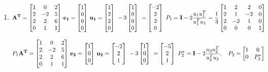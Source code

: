 \documentclass[english,onecolumn]{IEEEtran}
\begin{document}
\begin{enumerate}
	\item  \[
	{\bf A^T}=
	\begin{bmatrix}
		1&0&2\\
		2&-2&5\\
		2&2&6\\
		0&1&1
	\end{bmatrix}\,
	{\bf e_1}=
	\begin{bmatrix}
		1\\
		0\\
		0\\
		0
	\end{bmatrix}\,
	{\bf u_1}=
	\begin{bmatrix}
		1\\
		2\\
		2\\
		0
	\end{bmatrix}\
	-3
	\begin{bmatrix}
		1\\
		0\\
		0\\
		0
	\end{bmatrix}\
	=
	\begin{bmatrix}
		-2\\
		2\\
		2\\
		0
	\end{bmatrix}\
	P_1 = \textbf{I} - 2 \frac{u_1 u_1^T}{u_1^T u_1}
	=\frac{1}{3}
	\begin{bmatrix}
		1&2&2&0\\
		2&1&-2&0\\
		2&-2&1&0\\
		0&0&0&1
	\end{bmatrix}\,
	\]
	
	 \[
	{P_1\bf A^T}=
	\begin{bmatrix}
		1&0&2\\
		2&-2&5\\
		2&2&6\\
		0&1&1
	\end{bmatrix}\,
	{\bf e_2}=
	\begin{bmatrix}
		1\\
		0\\
		0
	\end{bmatrix}\,
	{\bf u_2}=
	\begin{bmatrix}
		-2\\
		2\\
		1
	\end{bmatrix}\
	-3
	\begin{bmatrix}
		1\\
		0\\
		0
	\end{bmatrix}\
	=
	\begin{bmatrix}
		-5\\
		2\\
		1
	\end{bmatrix}\
	P_2^* = \textbf{I} - 2 \frac{u_2 u_2^T}{u_2^T u_2}, \quad
	P_2 = 
	\begin{bmatrix}
		1&0\\
		0&P_2^*\\
	\end{bmatrix}\
	\]


\end{enumerate}
\end{document}
